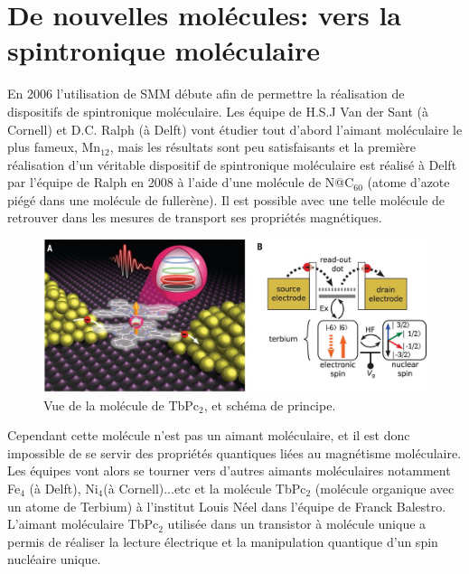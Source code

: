 \section{De nouvelles molécules: vers la spintronique moléculaire}
En 2006 l'utilisation de SMM débute afin de permettre la réalisation de dispositifs de spintronique moléculaire. Les équipe de H.S.J Van der Sant (à Cornell) et D.C. Ralph (à Delft) vont étudier tout d'abord l'aimant moléculaire le plus fameux, Mn$_{12}$, mais les résultats sont peu satisfaisants et la première réalisation d'un véritable dispositif de spintronique moléculaire est réalisé à Delft par l'équipe de Ralph en 2008 à l'aide d'une molécule de N@C$_{60}$ (atome d'azote piégé dans une molécule de fullerène). Il est possible avec une telle molécule de retrouver dans les mesures de transport ses propriétés magnétiques.\\

\begin{figure}[h]
    \begin{center}
        \includegraphics{Images/TbPc2.jpg}
        \caption{Vue de la molécule de TbPc$_2$, et schéma de principe.}
        \label{fig:}
    \end{center}
\end{figure}

Cependant cette molécule n'est pas un aimant moléculaire, et il est donc impossible de se servir des propriétés quantiques liées au magnétisme moléculaire. Les équipes vont alors se tourner vers d'autres aimants moléculaires notamment Fe$_{4}$ (à Delft), Ni$_{4}$(à Cornell)...etc et la molécule TbPc$_{2}$ (molécule organique avec un atome de Terbium) à l'institut Louis Néel dans l'équipe de Franck Balestro. L'aimant moléculaire TbPc$_{2}$ utilisée dans un transistor à molécule unique a permis de réaliser la lecture électrique et la manipulation quantique d'un spin nucléaire unique.
